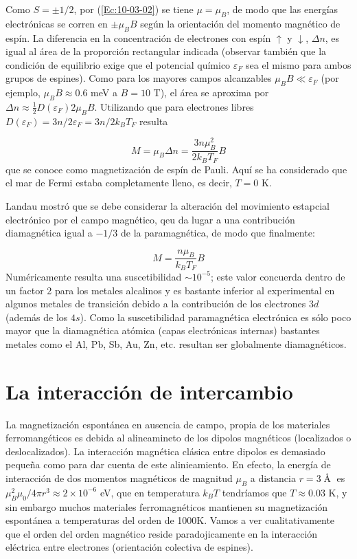 Como $S=\pm 1/2$, por (\ref{Ec:10-03-02}) se tiene $\mu=\mu_B$, de modo que las energías electrónicas se corren en $\pm \mu_B B$ según la orientación del momento magnético de espín. La diferencia en la concentración de electrones con espín $\uparrow$ y $\downarrow$, $\Delta n$, es igual al área de la proporción rectangular indicada (observar también que la condición de equilibrio exige que el potencial químico $\varepsilon_F$ sea el mismo para ambos grupos de espines). Como para los mayores campos alcanzables $\mu_B B \ll \varepsilon_F$ (por ejemplo, $\mu_B B \approx 0.6 $ meV a $B=10$ T), el área se aproxima por $\Delta n \approx \frac{1}{2} D (\varepsilon_F) 2 \mu_B B$. Utilizando que para electrones libres $D(\varepsilon_F) = 3n/2\varepsilon_F = 3n/2k_B T_F$ resulta 

\begin{equation}
	M= \mu_B \Delta n = \frac{3n\mu_B^2}{2k_B T_F} B
\end{equation}
que se conoce como magnetización de espín de Pauli. Aquí se ha considerado que el mar de Fermi estaba completamente lleno, es decir, $T=0$ K. 

Landau mostró que se debe considerar la alteración del movimiento estapcial electrónico por el campo magnético, qeu da lugar a una contribución diamagnética igual a $-1/3$ de la paramagnética, de modo que finalmente:

\begin{equation}
	M = \frac{n\mu_B}{k_B T_F} B
\end{equation}
Numéricamente resulta una suscetibilidad $\sim 10^{-5}$; este valor concuerda dentro de un factor 2 para los metales alcalinos y es bastante inferior al experimental en algunos metales de transición debido a la contribución de los electrones $3d$ (además de los $4s$). Como la suscetibilidad paramagnética electrónica es sólo poco mayor que la diamagnética atómica (capas electrónicas internas) bastantes metales como el Al, Pb, Sb, Au, Zn, etc. resultan ser globalmente diamagnéticos.


\section{La interacción de intercambio}

La magnetización espontánea en ausencia de campo, propia de los materiales ferromangéticos es debida al alineamineto de los dipolos magnéticos (localizados o deslocalizados). La interacción magnética clásica entre dipolos es demasiado pequeña como para dar cuenta de este alinieamiento. En efecto, la energía de interacción de dos momentos magnéticos de magnitud $\mu_B$ a distancia $r=3\unit{\Angstrom}$ es $\mu_B^2 \mu_0 / 4\pi r^3 \approx 2 \times 10^{-6} $ eV, que en temperatura $k_BT$ tendríamos que $T\approx 0.03$ K, y sin embargo muchos materiales ferromagnéticos mantienen su magnetización espontánea a temperaturas del orden de 1000K. Vamos a ver cualitativamente que el orden del orden magnético reside paradojicamente en la interacción eléctrica entre electrones (orientación colectiva de espines).

